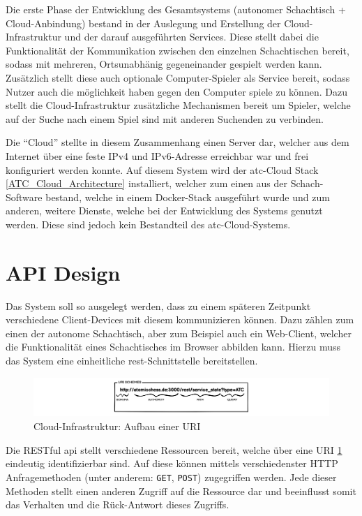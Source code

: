 Die erste Phase der Entwicklung des Gesamtsystems (autonomer Schachtisch
+ Cloud-Anbindung) bestand in der Auslegung und Erstellung der
Cloud-Infrastruktur und der darauf ausgeführten Services. Diese stellt
dabei die Funktionalität der Kommunikation zwischen den einzelnen
Schachtischen bereit, sodass mit mehreren, Ortsunabhänig gegeneinander
gespielt werden kann. Zusätzlich stellt diese auch optionale
Computer-Spieler als Service bereit, sodass Nutzer auch die möglichkeit
haben gegen den Computer spiele zu können. Dazu stellt die
Cloud-Infrastruktur zusätzliche Mechanismen bereit um Spieler, welche
auf der Suche nach einem Spiel sind mit anderen Suchenden zu verbinden.

Die ``Cloud'' stellte in diesem Zusammenhang einen Server dar, welcher
aus dem Internet über eine feste IPv4 und IPv6-Adresse erreichbar war
und frei konfiguriert werden konnte. Auf diesem System wird der
\gls{atc}-Cloud Stack \ref{ATC_Cloud_Architecture} installiert, welcher
zum einen aus der Schach-Software bestand, welche in einem Docker-Stack
ausgeführt wurde und zum anderen, weitere Dienste, welche bei der
Entwicklung des Systems genutzt werden. Diese sind jedoch kein
Bestandteil des \gls{atc}-Cloud-Systems.

\hypertarget{api-design}{%
\section{API Design}\label{api-design}}

Das System soll so ausgelegt werden, dass zu einem späteren Zeitpunkt
verschiedene Client-Devices mit diesem kommunizieren können. Dazu zählen
zum einen der autonome Schachtisch, aber zum Beispiel auch ein
Web-Client, welcher die Funktionalität eines Schachtisches im Browser
abbilden kann. Hierzu muss das System eine einheitliche
\gls{rest}-Schnittstelle bereitstellen.

\begin{figure}
\centering
\includegraphics{images/ATC_URI_SCHEMES.png}
\caption{Cloud-Infrastruktur: Aufbau einer URI \label{ATC_URI_SCHEMES}}
\end{figure}

Die RESTful \gls{api} stellt verschiedene Ressourcen bereit, welche über
eine URI \ref{ATC_URI_SCHEMES} eindeutig identifizierbar sind. Auf diese
können mittels verschiedenster HTTP Anfragemethoden (unter anderem:
\passthrough{\lstinline!GET!}, \passthrough{\lstinline!POST!})
zugegriffen werden. Jede dieser Methoden stellt einen anderen Zugriff
auf die Ressource dar und beeinflusst somit das Verhalten und die
Rück-Antwort dieses Zugriffs.

